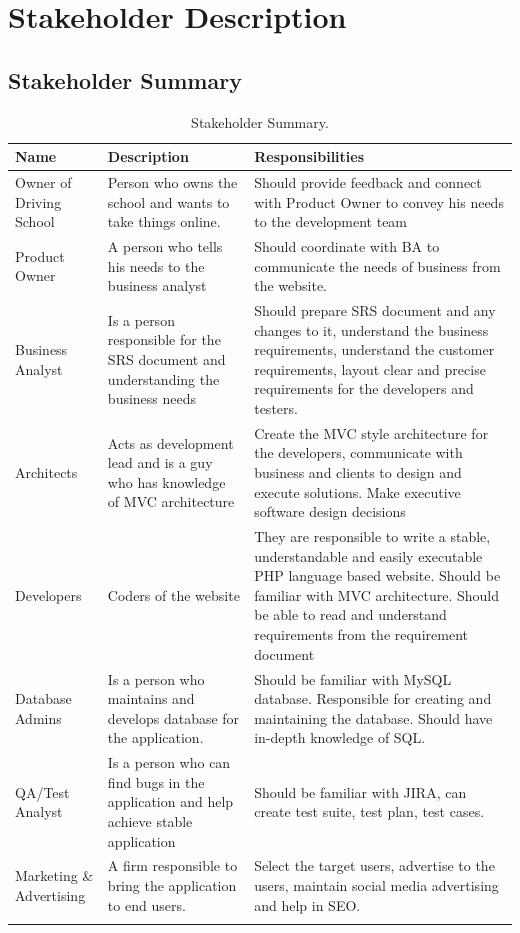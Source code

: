 \documentclass{report}
\begin{document}
\section{Stakeholder Description}

\subsection{Stakeholder Summary}


\begin{longtable}{|p{4.5cm}|p{4.5cm}|p{6.5cm}|}
\hline
\textbf{Name} & \textbf{Description} & \textbf{Responsibilities} \\ \hline
Owner of Driving School & Person who owns the school and wants to take things online.&Should provide feedback and connect with Product Owner to convey his needs to the development team\\ \hline
Product Owner & A person who tells his needs to the business analyst & Should coordinate with BA to communicate the needs of business from the website.\\ \hline
Business Analyst & Is a person responsible for the SRS document and understanding the business needs & Should prepare SRS document and any changes to it, understand the business requirements, understand the customer requirements, layout clear and precise requirements for the developers and testers.\\ \hline
Architects & Acts as development lead and is a guy who has knowledge of MVC architecture  & Create the MVC style architecture for the developers, communicate with business and clients to design and execute solutions. Make executive software design decisions\\ \hline
Developers & Coders of the website & They are responsible to write a stable, understandable and easily executable PHP language based website. Should be familiar with MVC architecture. Should be able to read and understand requirements from the requirement document\\ \hline
Database Admins & Is a person who maintains and develops database for the application. & Should be familiar with MySQL database. Responsible for creating and maintaining the database. Should have in-depth knowledge of SQL.\\ \hline
QA/Test Analyst & Is a person who can find bugs in the application and help achieve stable application & Should be familiar with JIRA, can create test suite, test plan, test cases.\\ \hline
Marketing \& Advertising & A firm responsible to bring the application to end users. & Select the target users, advertise to the users, maintain social media advertising and help in SEO. \\ \hline
\caption{Stakeholder Summary.\label{long}}
\end{longtable}
\end{document}
